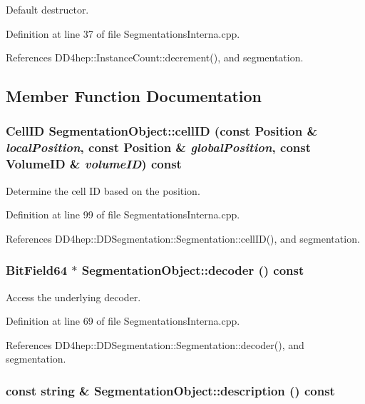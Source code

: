Default destructor. 

Definition at line 37 of file SegmentationsInterna.cpp.

References DD4hep::InstanceCount::decrement(), and segmentation.

\subsection{Member Function Documentation}
\hypertarget{class_d_d4hep_1_1_geometry_1_1_segmentation_object_ace43e4d369d28910913b6f2775291e37}{
\subsubsection[{cellID}]{\setlength{\rightskip}{0pt plus 5cm}CellID SegmentationObject::cellID (const {\bf Position} \& {\em localPosition}, \/  const {\bf Position} \& {\em globalPosition}, \/  const VolumeID \& {\em volumeID}) const}}
\label{class_d_d4hep_1_1_geometry_1_1_segmentation_object_ace43e4d369d28910913b6f2775291e37}


Determine the cell ID based on the position. 

Definition at line 99 of file SegmentationsInterna.cpp.

References DD4hep::DDSegmentation::Segmentation::cellID(), and segmentation.\hypertarget{class_d_d4hep_1_1_geometry_1_1_segmentation_object_a1fb5b783285a54fb554a5312c0cfebcc}{
\subsubsection[{decoder}]{\setlength{\rightskip}{0pt plus 5cm}BitField64 $\ast$ SegmentationObject::decoder () const}}
\label{class_d_d4hep_1_1_geometry_1_1_segmentation_object_a1fb5b783285a54fb554a5312c0cfebcc}


Access the underlying decoder. 

Definition at line 69 of file SegmentationsInterna.cpp.

References DD4hep::DDSegmentation::Segmentation::decoder(), and segmentation.\hypertarget{class_d_d4hep_1_1_geometry_1_1_segmentation_object_aaee5396e4d743bb2df49c381cc0a766b}{
\subsubsection[{description}]{\setlength{\rightskip}{0pt plus 5cm}const {\bf string} \& SegmentationObject::description () const}}
\label{class_d_d4hep_1_1_geometry_1_1_segmentation_object_aaee5396e4d743bb2df49c381cc0a766b}


